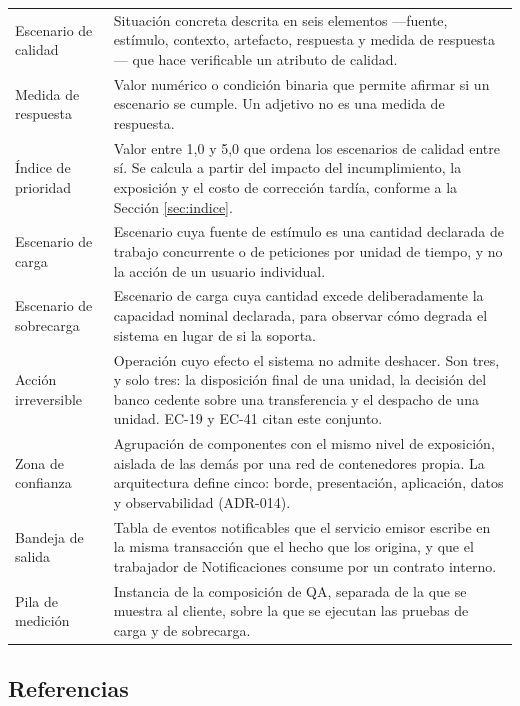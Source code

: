 \documentclass[11pt,a4paper]{article}
\begin{document}
\begin{longtable}{L{3.4cm} L{11.2cm}}
Escenario de calidad & Situación concreta descrita en seis elementos ---fuente, estímulo, contexto, artefacto, respuesta y medida de respuesta--- que hace verificable un atributo de calidad. \\
Medida de respuesta & Valor numérico o condición binaria que permite afirmar si un escenario se cumple. Un adjetivo no es una medida de respuesta. \\
Índice de prioridad & Valor entre 1,0 y 5,0 que ordena los escenarios de calidad entre sí. Se calcula a partir del impacto del incumplimiento, la exposición y el costo de corrección tardía, conforme a la Sección \ref{sec:indice}. \\
Escenario de carga & Escenario cuya fuente de estímulo es una cantidad declarada de trabajo concurrente o de peticiones por unidad de tiempo, y no la acción de un usuario individual. \\
Escenario de sobrecarga & Escenario de carga cuya cantidad excede deliberadamente la capacidad nominal declarada, para observar cómo degrada el sistema en lugar de si la soporta. \\
Acción irreversible & Operación cuyo efecto el sistema no admite deshacer. Son tres, y solo tres: la disposición final de una unidad, la decisión del banco cedente sobre una transferencia y el despacho de una unidad. EC-19 y EC-41 citan este conjunto. \\
Zona de confianza & Agrupación de componentes con el mismo nivel de exposición, aislada de las demás por una red de contenedores propia. La arquitectura define cinco: borde, presentación, aplicación, datos y observabilidad (ADR-014). \\
Bandeja de salida & Tabla de eventos notificables que el servicio emisor escribe en la misma transacción que el hecho que los origina, y que el trabajador de Notificaciones consume por un contrato interno. \\
Pila de medición & Instancia de la composición de QA, separada de la que se muestra al cliente, sobre la que se ejecutan las pruebas de carga y de sobrecarga. \\
\end{longtable}

\subsection{Referencias}
\end{document}
